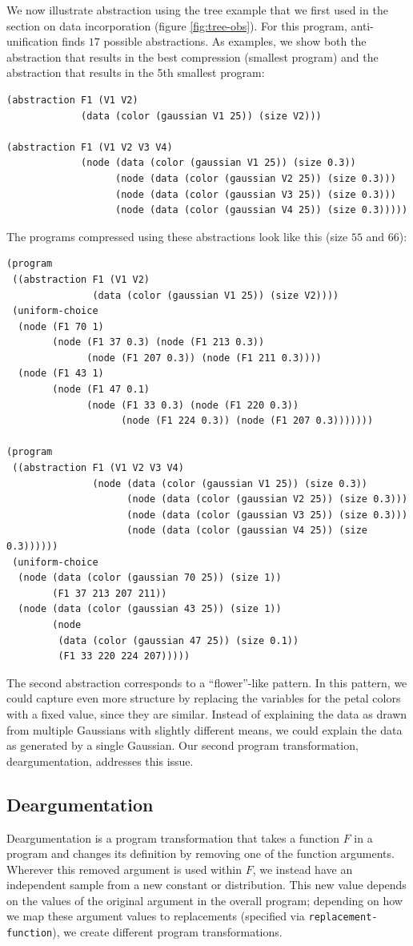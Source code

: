 \documentclass[a4paper,10pt]{article}
\begin{document}
We now illustrate abstraction using the tree example that we first used in the section on data incorporation (figure \ref{fig:tree-obs}).
For this program, anti-unification finds $17$ possible abstractions. As examples, we show both the abstraction that results in the best compression (smallest program) and the abstraction that results in the 5th smallest program:
\begin{lstlisting}
(abstraction F1 (V1 V2)
             (data (color (gaussian V1 25)) (size V2)))

(abstraction F1 (V1 V2 V3 V4)
             (node (data (color (gaussian V1 25)) (size 0.3))
                   (node (data (color (gaussian V2 25)) (size 0.3)))
                   (node (data (color (gaussian V3 25)) (size 0.3)))
                   (node (data (color (gaussian V4 25)) (size 0.3)))))
\end{lstlisting}
The programs compressed using these abstractions look like this (size $55$ and $66$):
\begin{lstlisting}
(program
 ((abstraction F1 (V1 V2)
               (data (color (gaussian V1 25)) (size V2))))
 (uniform-choice
  (node (F1 70 1)
        (node (F1 37 0.3) (node (F1 213 0.3))
              (node (F1 207 0.3)) (node (F1 211 0.3))))
  (node (F1 43 1)
        (node (F1 47 0.1)
              (node (F1 33 0.3) (node (F1 220 0.3))
                    (node (F1 224 0.3)) (node (F1 207 0.3)))))))

(program
 ((abstraction F1 (V1 V2 V3 V4)
               (node (data (color (gaussian V1 25)) (size 0.3))
                     (node (data (color (gaussian V2 25)) (size 0.3)))
                     (node (data (color (gaussian V3 25)) (size 0.3)))
                     (node (data (color (gaussian V4 25)) (size 0.3))))))
 (uniform-choice
  (node (data (color (gaussian 70 25)) (size 1))
        (F1 37 213 207 211))
  (node (data (color (gaussian 43 25)) (size 1))
        (node
         (data (color (gaussian 47 25)) (size 0.1))
         (F1 33 220 224 207)))))
\end{lstlisting}
The second abstraction corresponds to a ``flower''-like pattern. In this pattern, we could capture even more structure by replacing the variables for the petal colors with a fixed value, since they are similar. Instead of explaining the data as drawn from multiple Gaussians with slightly different means, we could explain the data as generated by a single Gaussian. Our second program transformation, deargumentation, addresses this issue.
\subsection{Deargumentation}
Deargumentation is a program transformation that takes a function $F$ in a program and changes its definition by removing one of the function arguments. Wherever this removed argument is used within $F$, we instead have an independent sample from a new constant or distribution. This new value depends on the values of the original argument in the overall program; depending on how we map these argument values to replacements (specified via \texttt{replacement-function}), we create different program transformations.
\end{document}
